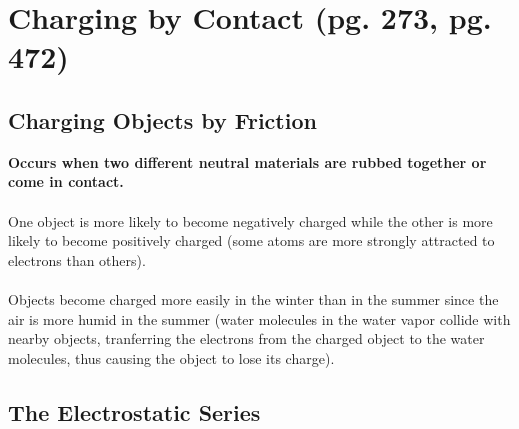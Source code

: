 \documentclass{article}
\begin{document}
\newpage

\section{Charging by Contact (pg. 273, pg. 472)}

    \subsection*{Charging Objects by Friction}

    \textbf{Occurs when two different neutral materials are rubbed together or come in contact.}\\\\
    One object is more likely to become negatively charged while the other is more likely to become positively charged (some atoms are more strongly attracted to electrons than others).\\\\
    Objects become charged more easily in the winter than in the summer since the air is more humid in the summer (water molecules in the water vapor collide with nearby objects, tranferring the electrons from the charged object to the water molecules, thus causing the object to lose its charge). \\

    \subsection*{The Electrostatic Series}
\end{document}
